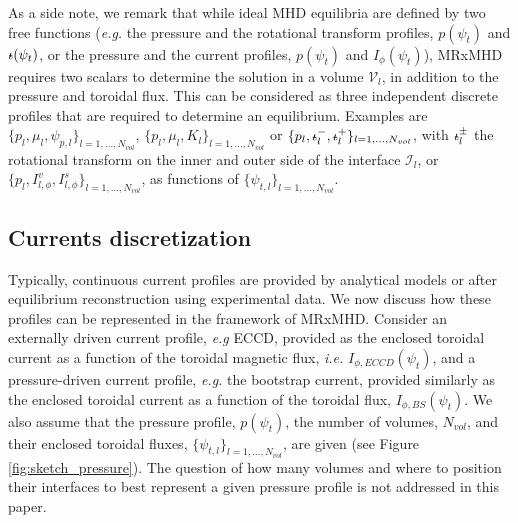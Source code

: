 \documentclass[my_thesis.tex]{subfiles}
\begin{document}
As a side note, we remark that while ideal \ac{MHD} equilibria are defined by two free functions (\textit{e.g.} the pressure and the rotational transform profiles, $p(\psi_t)$ and $\text{$\iota\!\!$-}(\psi_t)$, or the pressure and the current profiles, $p(\psi_t)$ and $I_\phi(\psi_t)$), \ac{MRxMHD} requires two scalars to determine the solution in a volume $\mathcal{V}_l$, in addition to the pressure and toroidal flux. This can be considered as three independent discrete profiles that are required to determine an equilibrium. Examples are $\{p_l, \mu_l, \psi_{p,l}\}_{l=1,\ldots,N_{vol}}$, $\{p_l, \mu_l, K_l\}_{l=1,\ldots,N_{vol}}$ or $\{p_l,\text{$\iota\!\!$-}^-_l,\text{$\iota\!\!$-}^+_l\}_{l=1,\ldots,N_{vol}}$, with $\text{$\iota\!\!$-}^\pm_l$ the rotational transform on the inner and outer side of the interface $\mathcal{I}_l$, or $\{p_l,I^v_{l,\phi},I^s_{l,\phi}\}_{l=1,\ldots,N_{vol}}$, as functions of $\{\psi_{t,l}\}_{l=1,\ldots,N_{vol}}$.

\subsection{Currents discretization}

Typically, continuous current profiles are provided by analytical models or after equilibrium reconstruction using experimental data. We now discuss how these profiles can be represented in the framework of \ac{MRxMHD}. Consider an externally driven current profile, \textit{e.g} \ac{ECCD}, provided as the enclosed toroidal current as a function of the toroidal magnetic flux, \textit{i.e.} $I_{\phi,ECCD}(\psi_t)$, and a pressure-driven current profile, \textit{e.g.} the bootstrap current, provided similarly as the enclosed toroidal current as a function of the toroidal flux, $I_{\phi,BS}(\psi_t)$. We also assume that the pressure profile, $p(\psi_t)$, the number of volumes, $N_{vol}$, and their enclosed toroidal fluxes, $\{\psi_{t,l}\}_{l=1,\ldots,N_{vol}}$, are given (see Figure \ref{fig:sketch_pressure}). The question of how many volumes and where to position their interfaces to best represent a given pressure profile is not addressed in this paper.
\end{document}
